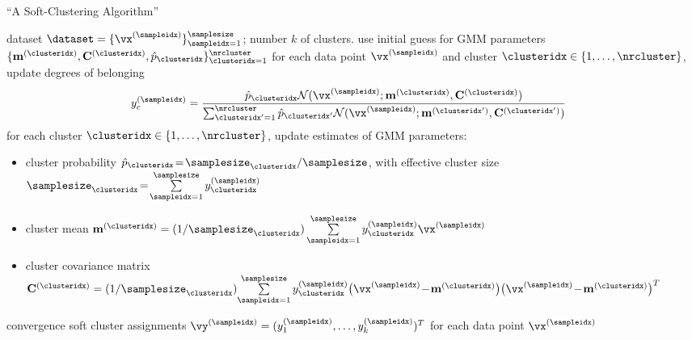 \documentclass[12pt]{report}
\begin{document}
\begin{algorithm}[htbp]
\caption{``A Soft-Clustering Algorithm'' \cite{BishopBook}}\label{alg:softclustering}

\begin{algorithmic}[1]
\renewcommand{\algorithmicrequire}{\textbf{Input:}}
\renewcommand{\algorithmicensure}{\textbf{Output:}}
\Require   dataset $\dataset=\{ \vx^{(\sampleidx)}\}_{\sampleidx=1}^{\samplesize}$; number $k$ of clusters. 
\Statex\hspace{-6mm}{\bf Initialize:} use initial guess for GMM parameters $\{\mathbf{m}^{(\clusteridx)},\mathbf{C}^{(\clusteridx)},\hat{p}_{\clusteridx}\}_{\clusteridx=1}^{\nrcluster}$ 
\Repeat
\vspace*{2mm}
\State for each data point $\vx^{(\sampleidx)}$ and cluster $\clusteridx \in \{1,\ldots,\nrcluster\}$, update degrees of belonging
\vspace*{-1mm}
\begin{align}
\label{equ_update_soft_cluster_assignm}
y_{c}^{(\sampleidx)} & =  \frac{\hat{p}_{\clusteridx} \mathcal{N}(\vx^{(\sampleidx)};\mathbf{m}^{(\clusteridx)},\mathbf{C}^{(\clusteridx)})}{\sum_{\clusteridx'=1}^{\nrcluster} \hat{p}_{\clusteridx'}\mathcal{N}(\vx^{(\sampleidx)};\mathbf{m}^{(\clusteridx')},\mathbf{C}^{(\clusteridx')})} %
\end{align}
\State for each cluster $\clusteridx \in \{1,\ldots,\nrcluster\}$, update estimates of GMM parameters: 
\begin{itemize} 
\item cluster probability $\hat{p}_{\clusteridx}\!=\!\samplesize_{\clusteridx}/\samplesize$, with effective cluster size $\samplesize_{\clusteridx}\!=\!\sum\limits_{\sampleidx=1}^{\samplesize} y_{\clusteridx}^{(\sampleidx)}$
\item cluster mean $\mathbf{m}^{(\clusteridx)} = (1/\samplesize_{\clusteridx}) \sum\limits_{\sampleidx=1}^{\samplesize} y_{\clusteridx}^{(\sampleidx)} \vx^{(\sampleidx)}$ 
\item cluster covariance matrix $\mathbf{C}^{(\clusteridx)}  = (1/\samplesize_{\clusteridx}) {\sum\limits_{\sampleidx=1}^{\samplesize} y_{\clusteridx}^{(\sampleidx)} \big(\vx^{(\sampleidx)}\!-\!\mathbf{m}^{(\clusteridx)}\big)   \big(\vx^{(\sampleidx)}\!-\!\mathbf{m}^{(\clusteridx)}\big)^{T} }$
\end{itemize}
\vspace*{1mm}
\Until convergence \label{equ_conv_soft_clustering_algo}
\Ensure soft cluster assignments $\vy^{(\sampleidx)}=(y_{1}^{(\sampleidx)},\ldots,y_{k}^{(\sampleidx)})^{T}$ for each data point $\vx^{(\sampleidx)}$ 
\end{algorithmic}
\end{algorithm}
\end{document}
